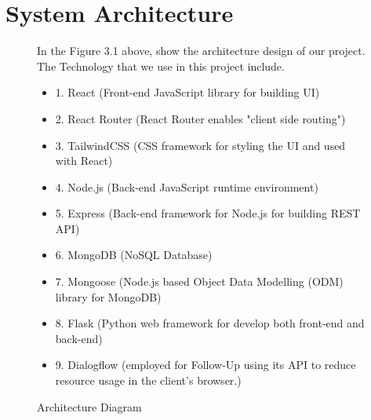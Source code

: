 \documentclass[12pt,oneside,openright,a4paper]{cpe-english-project}
\begin{document}
  \section{System Architecture}
  \begin{figure}[!h]
    \centering
    \caption{Architecture Diagram}\label{fig:System_Architecture}
    \begin{flushleft}
      \qquad In the Figure 3.1 above, show the architecture design of our project. The Technology that we use in this project include. \par
      \begin{itemize}
        \item[] 1. React (Front-end JavaScript library for building UI)
        \item[] 2. React Router (React Router enables "client side routing")
        \item[] 3. TailwindCSS (CSS framework for styling the UI and used with React)
        \item[] 4. Node.js (Back-end JavaScript runtime environment)
        \item[] 5. Express (Back-end framework for Node.js for building REST API)
        \item[] 6. MongoDB (NoSQL Database)
        \item[] 7. Mongoose (Node.js based Object Data Modelling (ODM) library for MongoDB)
        \item[] 8. Flask (Python web framework for develop both front-end and back-end)
        \item[] 9. Dialogflow (employed for Follow-Up using its API to reduce resource usage in the client’s browser.)
      \end{itemize}
    \end{flushleft}        
  \end{figure}

  \newpage
\end{document}

